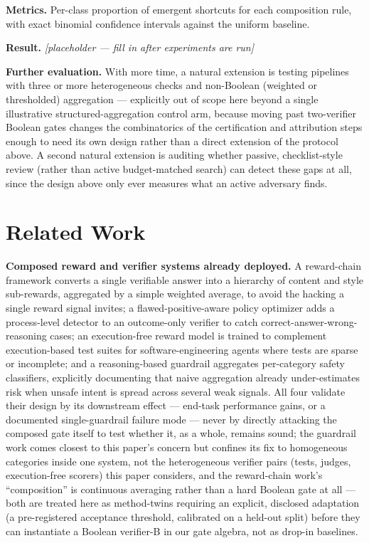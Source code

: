 \documentclass[11pt]{article}
\newcommand{\ph}{\textit{[placeholder --- fill in after experiments are run]}}
\begin{document}
\textbf{Metrics.} Per-class proportion of emergent shortcuts for each composition rule, with exact binomial confidence intervals against the uniform baseline.

\textbf{Result.} \ph

\vspace{0.5em}
\noindent\textbf{Further evaluation.} With more time, a natural extension is testing pipelines with three or more heterogeneous checks and non-Boolean (weighted or thresholded) aggregation --- explicitly out of scope here beyond a single illustrative structured-aggregation control arm, because moving past two-verifier Boolean gates changes the combinatorics of the certification and attribution steps enough to need its own design rather than a direct extension of the protocol above. A second natural extension is auditing whether passive, checklist-style review (rather than active budget-matched search) can detect these gaps at all, since the design above only ever measures what an active adversary finds.

\section{Related Work}

\textbf{Composed reward and verifier systems already deployed.} A reward-chain framework \citep{rewardchain2601} converts a single verifiable answer into a hierarchy of content and style sub-rewards, aggregated by a simple weighted average, to avoid the hacking a single reward signal invites; a flawed-positive-aware policy optimizer \citep{fapo2510} adds a process-level detector to an outcome-only verifier to catch correct-answer-wrong-reasoning cases; an execution-free reward model \citep{swerm2512} is trained to complement execution-based test suites for software-engineering agents where tests are sparse or incomplete; and a reasoning-based guardrail \citep{r2guard2407} aggregates per-category safety classifiers, explicitly documenting that naive aggregation already under-estimates risk when unsafe intent is spread across several weak signals. All four validate their design by its downstream effect --- end-task performance gains, or a documented single-guardrail failure mode --- never by directly attacking the composed gate itself to test whether it, as a whole, remains sound; the guardrail work comes closest to this paper's concern but confines its fix to homogeneous categories inside one system, not the heterogeneous verifier pairs (tests, judges, execution-free scorers) this paper considers, and the reward-chain work's ``composition'' is continuous averaging rather than a hard Boolean gate at all --- both are treated here as method-twins requiring an explicit, disclosed adaptation (a pre-registered acceptance threshold, calibrated on a held-out split) before they can instantiate a Boolean verifier-B in our gate algebra, not as drop-in baselines.
\end{document}
